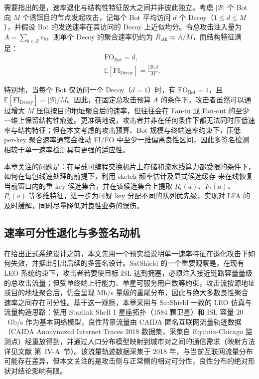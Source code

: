 需要指出的是，速率退化与结构性特征放大之间并非彼此独立。考虑 $|\mathcal{B}|$ 个 Bot 向 $M$ 个诱饵目的节点发起攻击，记每个 Bot 平均访问 $d$ 个 Decoy（$1\le d\le M$），并假设 Bot 的发送速率在其访问的 Decoy 上近似均分。令总攻击注入量为 $A=\sum_{b\in\mathcal{B}}r_b$，则单个 Decoy 的聚合速率仍约为 $R_{\text{atk}}\approx A/M$，而结构特征满足：
\begin{subequations}\label{eq:fi_lower}
\begin{align}
&\mathrm{FO}_{\text{Bot}} = d,
\label{eq:fi_lower_fo}\\[0.35em]
&\mathbb{E}[\mathrm{FI}_{\text{Decoy}}] = \frac{|\mathcal{B}|\,d}{M}.
\label{eq:fi_lower_fi}
\end{align}
\end{subequations}

特别地，当每个 Bot 仅访问一个 Decoy（$d=1$）时，有 $\mathrm{FO}_{\text{Bot}}=1$，且 $\mathbb{E}[\mathrm{FI}_{\text{Decoy}}]=|\mathcal{B}|/M$。因此，在固定总攻击预算 $A$ 的条件下，攻击者虽然可以通过增大 $M$ 压低按目的地址聚合后的速率，但往往会在 Fan-in 或 Fan-out 的至少一维上保留结构性痕迹。更准确地说，攻击者并非在任何条件下都无法同时压低速率与结构特征；但在本文考虑的攻击预算、Bot 规模与终端速率约束下，压低 per-key 聚合速率通常会推动 FI/FO 中至少一维偏离良性区间，因此多签名检测相较于单一速率检测具有更强的适应性。

本章关注的问题是：在星载可编程交换机片上存储和流水线算力都受限的条件下，如何在每包线速处理的前提下，利用 sketch 频率估计及显式候选缓存 来在线恢复当前窗口内的重 key 候选集合，并在该候选集合上提取 $R_t(a)$、$F_t(a)$、$P_t(a)$ 等多维特征，进一步为可疑 key 分配不同的队列优先级，实现对 LFA 的及时缓解，同时尽量降低对良性业务的误伤。

\subsection{速率可分性退化与多签名动机}
在给出正式系统设计之前，本文先用一个预实验说明单一速率特征在退化攻击下如何失效，并据此引出后续的多签名设计。SatShield 的一个重要观察是，在现有 LEO 系统约束下，攻击者若要使目标 ISL 达到拥塞，必须注入接近链路容量量级的总攻击流量；但受单终端上行能力、单星可服务用户数等约束，攻击流按源地址或目的地址聚合后，仍会呈现 Mb/s 量级的重尾分布，因此与绝大多数良性聚合速率之间存在可分性。基于这一观察，本章采用与 SatShield 一致的 LEO 仿真与流量构造思路：使用 Starlink Shell 1 星座拓扑（1584 颗卫星）和 ISL 容量 $20$~Gb/s 作为基本网络模型，良性背景流量由 CAIDA 匿名互联网流量轨迹数据（CAIDA Anonymized Internet Traces 2018 数据集，采集自 Equinix-Chicago 监测点）经重放得到，并通过人口分布模型映射到城市对之间的通信需求（映射方法详见文献\cite{satshield} 第~IV-A~节）。该流量轨迹数据采集于 2018 年，与当前互联网流量分布可能存在差异，但本文关注的是攻击侧与正常侧的相对可分性，良性分布的绝对形状对结论影响有限。

